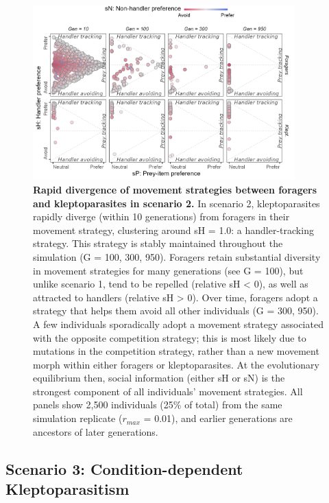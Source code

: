 \begin{refsection}[sorting=nyt]
\begin{figure}[t!]
    \centering
    \includegraphics[width=0.9\textwidth]{figures/kleptomove/fig_03.png}
    \caption{
       \textbf{Rapid divergence of movement strategies between foragers and kleptoparasites in scenario 2.}
       In scenario 2, kleptoparasites rapidly diverge (within 10 generations) from foragers in their movement strategy, clustering around sH = 1.0: a handler-tracking strategy.
       This strategy is stably maintained throughout the simulation (G = 100, 300, 950).
       Foragers retain substantial diversity in movement strategies for many generations (see G = 100), but unlike scenario 1, tend to be repelled (relative sH < 0), as well as attracted to handlers (relative sH > 0).
       Over time, foragers adopt a strategy that helps them avoid all other individuals (G = 300, 950).
       A few individuals sporadically adopt a movement strategy associated with the opposite competition strategy; this is most likely due to mutations in the competition strategy, rather than a new movement morph within either foragers or kleptoparasites.
       At the evolutionary equilibrium then, social information (either sH or sN) is the strongest component of all individuals' movement strategies.
       All panels show 2,500 individuals (25\% of total) from the same simulation replicate ($r_{max}$ = 0.01), and earlier generations are ancestors of later generations.
    }
    \label{fig3}
\end{figure}

\subsection*{Scenario 3: Condition-dependent Kleptoparasitism}


\end{refsection}
